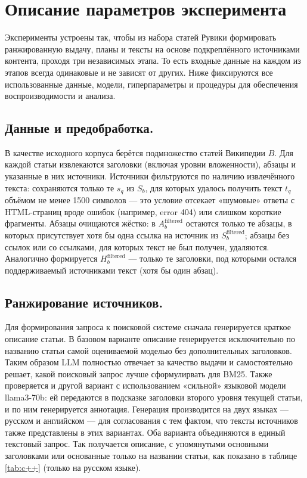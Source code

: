 \documentclass{article}
\theoremstyle{definition}
\theoremstyle{plain}
\begin{document}
\section*{Описание параметров эксперимента}

Эксперименты устроены так, чтобы из набора статей Рувики формировать ранжированную выдачу, планы и тексты на основе подкреплённого источниками контента, проходя три независимых этапа.
То есть входные данные на каждом из этапов всегда одинаковые и не зависят от других.
Ниже фиксируются все использованные данные, модели, гиперпараметры и процедуры для обеспечения воспроизводимости и анализа.

\subsection*{Данные и предобработка.}
В качестве исходного корпуса берётся подмножество статей Википедии \(B\). Для каждой статьи извлекаются заголовки (включая уровни вложенности), абзацы и указанные в них источники. 
Источники фильтруются по наличию извлечённого текста: сохраняются только те \(s_q\) из \(S_b\), для которых удалось получить текст \(t_q\) объёмом не менее 1500 символов — это условие отсекает «шумовые» ответы с HTML-страниц вроде ошибок (например, error 404) или слишком короткие фрагменты. 
Абзацы очищаются жёстко: в \(A_b^{\mathrm{filtered}}\) остаются только те абзацы, в которых присутствует хотя бы одна ссылка на источник из \(S_b^{\mathrm{filtered}}\); абзацы без ссылок или со ссылками, для которых текст не был получен, удаляются. 
Аналогично формируется \(H_b^{\mathrm{filtered}}\) — только те заголовки, под которыми остался поддерживаемый источниками текст (хотя бы один абзац).

\subsection*{Ранжирование источников.}
Для формирования запроса к поисковой системе сначала генерируется краткое описание статьи.  
В базовом варианте описание генерируется исключительно по названию статьи самой оцениваемой моделью без дополнительных заголовков.
Таким образом LLM полностью отвечает за качество выдачи и самостоятельно решает, какой поисковый запрос лучше сформулирвать для BM25.
Также проверяется и другой вариант с использованием «сильной» языковой модели llama3-70b: ей передаются в подсказке заголовки второго уровня текущей статьи, и по ним генерируется аннотация. 
Генерация производится на двух языках — русском и английском — для согласования с тем фактом, что тексты источников также представлены в этих вариантах. 
Оба варианта объединяются в единый текстовый запрос.
Так получается описание, с упомянутыми основными заголовками или основанные только на названии статьи, как показано в таблице \ref{tab:c++} (только на русском языке).
\end{document}
